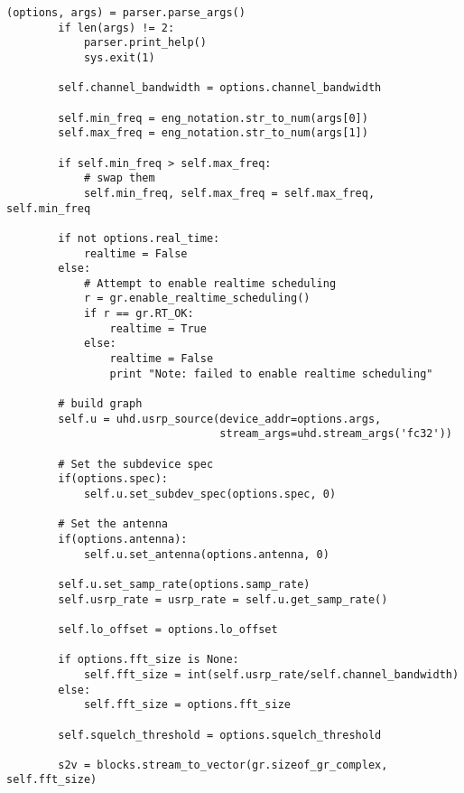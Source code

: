 \begin{lstlisting}[breaklines]
        (options, args) = parser.parse_args()
        if len(args) != 2:
            parser.print_help()
            sys.exit(1)

        self.channel_bandwidth = options.channel_bandwidth

        self.min_freq = eng_notation.str_to_num(args[0])
        self.max_freq = eng_notation.str_to_num(args[1])

        if self.min_freq > self.max_freq:
            # swap them
            self.min_freq, self.max_freq = self.max_freq, self.min_freq

        if not options.real_time:
            realtime = False
        else:
            # Attempt to enable realtime scheduling
            r = gr.enable_realtime_scheduling()
            if r == gr.RT_OK:
                realtime = True
            else:
                realtime = False
                print "Note: failed to enable realtime scheduling"

        # build graph
        self.u = uhd.usrp_source(device_addr=options.args,
                                 stream_args=uhd.stream_args('fc32'))

        # Set the subdevice spec
        if(options.spec):
            self.u.set_subdev_spec(options.spec, 0)

        # Set the antenna
        if(options.antenna):
            self.u.set_antenna(options.antenna, 0)

        self.u.set_samp_rate(options.samp_rate)
        self.usrp_rate = usrp_rate = self.u.get_samp_rate()

        self.lo_offset = options.lo_offset

        if options.fft_size is None:
            self.fft_size = int(self.usrp_rate/self.channel_bandwidth)
        else:
            self.fft_size = options.fft_size

        self.squelch_threshold = options.squelch_threshold

        s2v = blocks.stream_to_vector(gr.sizeof_gr_complex, self.fft_size)


\end{lstlisting}
